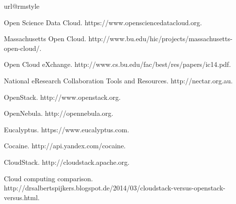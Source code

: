 
%
%
%

\begin{thebibliography}{10}
\providecommand{\url}[1]{#1}
\csname url@rmstyle\endcsname
\providecommand{\newblock}{\relax}
\providecommand{\bibinfo}[2]{#2}
\providecommand\BIBentrySTDinterwordspacing{\spaceskip=0pt\relax}
\providecommand\BIBentryALTinterwordstretchfactor{4}
\providecommand\BIBentryALTinterwordspacing{\spaceskip=\fontdimen2\font plus
\BIBentryALTinterwordstretchfactor\fontdimen3\font minus
  \fontdimen4\font\relax}
\providecommand\BIBforeignlanguage[2]{{%
\expandafter\ifx\csname l@#1\endcsname\relax
\typeout{** WARNING: IEEEtran.bst: No hyphenation pattern has been}%
\typeout{** loaded for the language `#1'. Using the pattern for}%
\typeout{** the default language instead.}%
\else
\language=\csname l@#1\endcsname
\fi
#2}}

Open Science Data Cloud. https://www.opensciencedatacloud.org.

Massachusetts Open Cloud. http://www.bu.edu/hic/projects/massachusetts-open-cloud/.

Open Cloud eXchange. http://www.cs.bu.edu/fac/best/res/papers/ic14.pdf.

National eResearch Collaboration Tools and Resources. http://nectar.org.au.

OpenStack. http://www.openstack.org.

OpenNebula. http://opennebula.org.

Eucalyptus. https://www.eucalyptus.com.

Cocaine. http://api.yandex.com/cocaine.

CloudStack. http://cloudstack.apache.org.

Cloud computing comparison. http://drsalbertspijkers.blogspot.de/2014/03/cloudstack-versus-openstack-versus.html.














\end{thebibliography}



